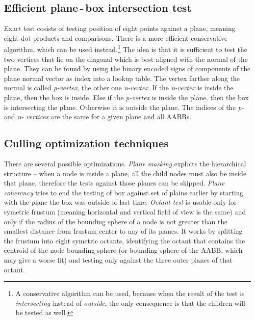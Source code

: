 \documentclass[report,11pt]{elsarticle}
\begin{document}
\subsection{Efficient plane\,-\,box intersection test}
Exact test cosists of testing position of eight points against a plane, meaning eight dot products and comparisons. There is a more efficient conservative algorithm, which can be used instead.\footnote{A conservative algorithm can be used, because when the result of the test is \emph{intersecting} instead of \emph{outside}, the only consequence is that the children will be tested as well.} The idea is that it is sufficient to test the two vertices that lie on the diagonal which is best aligned with the normal of the plane. They can be found by using the binary encoded signs of components of the plane normal vector as index into a lookup table. The vertex farther along the normal is called \emph{p-vertex}, the other one \emph{n-vertex}. If the \emph{n-vertex} is inside the plane, then the box is inside. Else if the \emph{p-vertex} is inside the plane, then the box is intersecting the plane. Otherwise it is outside the plane. The indices of the \emph{p-} and \emph{n- vertices} are the same for a given plane and all AABBs.

\subsection{Culling optimization techniques}
There are several possible optimizations. \emph{Plane masking} exploits the hierarchical structure -- when a node is inside a plane, all the child nodes must also be inside that plane, therefore the tests against those planes can be skipped. \emph{Plane coherency} tries to end the testing of box against set of plains earlier by starting with the plane the box was outside of last time. \emph{Octant test} is usable only for symetric frustum (meaning horizontal and vertical field of view is the same) and only if the radius of the bounding sphere of a node is not greater than the smallest distance from frustum center to any of its planes. It works by splitting the frustum into eight symetric octants, identifying the octant that contains the centroid of the node bounding sphere (or bounding sphere of the AABB, which may give a worse fit) and testing only against the three outer planes of that octant.

\end{document}
